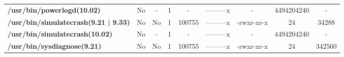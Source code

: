 \begin{center}
{\begin{tabular}{|>{\bfseries} l | C | C | C | C | C | C | C | C |}
					/usr/bin/powerlogd(10.02) & No & - & 1 & - & ---------x & - & 4494204240 & -\\ 
					/usr/bin/simulatecrash(9.21 | 9.33) & No & No & \color{green}1 & \color{red}100755 & \color{green}---------x & \color{red}-rwxr-xr-x & \color{green}24 & \color{red}34288\\ 
					/usr/bin/simulatecrash(10.02) & No & - & 1 & - & ---------x & - & 4494204240 & -\\ 
					/usr/bin/sysdiagnose(9.21) & No & No & \color{green}1 & \color{red}100755 & \color{green}---------x & \color{red}-rwxr-xr-x & \color{green}24 & \color{red}342560\\ 

			\end{tabular}
		}
	\end{center}



